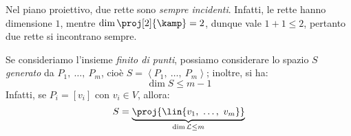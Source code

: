 \begin{example}
	Nel piano proiettivo, due rette sono \textit{sempre incidenti}. Infatti, le rette hanno dimensione $1$, mentre $\dim\proj[2]{\kamp}=2$, dunque vale $1+1\leq 2$, pertanto due rette si incontrano sempre.
\end{example}
\begin{observe}
	Se consideriamo l'insieme \textit{finito di punti}, possiamo considerare lo spazio $S$ \textit{generato} da $P_1,\ \ldots,\ P_m$, cioè $S=\left<P_1,\ \ldots,\ P_m\right>$; inoltre, si ha:
	\begin{equation*}
		\dim S\leq m-1
	\end{equation*}
	Infatti, se $P_i=\left[v_i\right]$ con $v_i\in V$, allora:
	\begin{equation*}
		S=\underbrace{\proj{\lin{v_1,\ \ldots,\ v_m}}}_{\dim \mathcal{L} \leq m}
	\end{equation*}
\end{observe}
